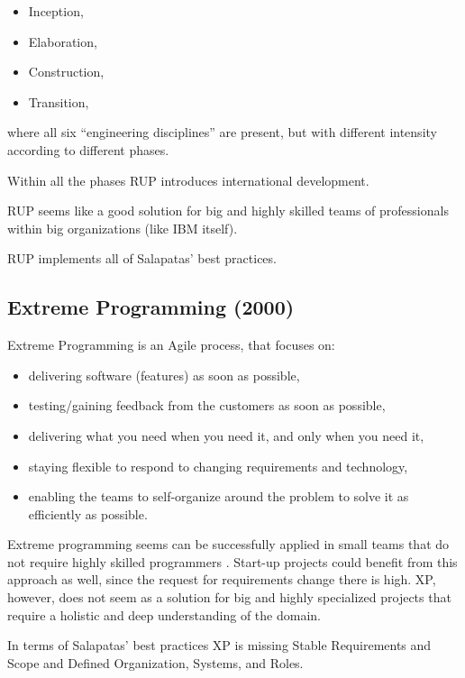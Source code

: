 \begin{itemize}
\item
  Inception,
\item
  Elaboration,
\item
  Construction,
\item
  Transition,
\end{itemize}

where all six ``engineering disciplines'' are present, but with
different intensity according to different phases.

Within all the phases RUP introduces international development.

RUP seems like a good solution for big and highly skilled teams of
professionals within big organizations (like IBM itself).

RUP implements all of Salapatas' best practices.  

\subsection{Extreme Programming (2000)}\label{extreme-programming}

Extreme Programming is an Agile process, that focuses on:\cite{beck2004extreme}\cite{wiki:Extreme_programming}\cite{alliance_2018}

\begin{itemize}

\item
  delivering software (features) as soon as possible,
\item
  testing/gaining feedback from the customers as soon as possible,
\item
  delivering what you need when you need it, and only when you need it,
\item
  staying flexible to respond to changing requirements and technology,
\item
  enabling the teams to self-organize around the problem to solve it as
  efficiently as possible.
\end{itemize}

Extreme programming seems can be successfully applied in small teams
that do not require highly skilled programmers \cite{alliance_2018}. Start-up projects could benefit from this approach as well, since the request for requirements change there is high. XP, however, does not seem as a solution for big and highly specialized projects that require a holistic and deep understanding of the domain.

In terms of Salapatas' best practices XP is missing Stable Requirements and Scope and Defined Organization, Systems, and Roles.

